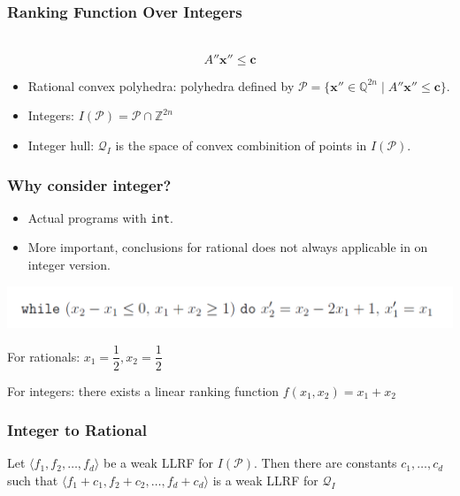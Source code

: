 \documentclass[11pt]{beamer}
\begin{document}
\begin{frame}\frametitle{Ranking Function Over Integers}\
\[A''\textbf{x}''\le \textbf{c}\]

\begin{itemize}
\item Rational convex polyhedra: polyhedra defined by $\mathcal{P}=\{\textbf{x}''\in \mathbb{Q}^{2n}\mid A''\textbf{x}''\le \textbf{c}\}$.

\item Integers: $I(\mathcal{P}) = \mathcal{P} \cap \mathbb{Z}^{2n}$

\item Integer hull: $\mathcal{Q}_I$ is the space of convex combinition of points in $I(\mathcal{P})$.

\end{itemize}

\end{frame}

\begin{frame}\frametitle{Why consider integer?}
\begin{itemize}
\item Actual programs with \texttt{int}.

\item More important, conclusions for rational does not always applicable in on integer version.

\end{itemize}
\begin{example}
\begin{center}

\includegraphics[scale = .3]{7.png}

\end{center}
For rationals: $x_1 = \dfrac{1}{2}, x_2 = \dfrac{1}{2}$

For integers: there exists a linear ranking function $f(x_1, x_2) = x_1 + x_2$
\end{example}
\end{frame}

\begin{frame}\frametitle{Integer to Rational}
\begin{theorem}
Let $\langle f_1, f_2, \ldots, f_d\rangle$ be a weak LLRF for $I(\mathcal{P})$. Then there are constants $c_1, \ldots, c_d$ such that $\langle f_1 + c_1, f_2 + c_2, \ldots, f_d + c_d\rangle$ is a weak LLRF for $\mathcal{Q}_I$

\end{theorem}
\end{frame}
\end{document}
